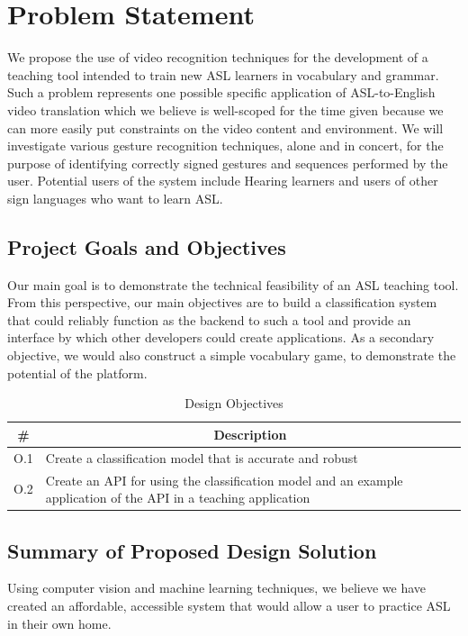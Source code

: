 \documentclass[12pt]{article}
\begin{document}
\newpage
\section{Problem Statement}
We propose the use of video recognition techniques for the development of a teaching tool intended to train new ASL learners in vocabulary and grammar. Such a problem represents one possible specific application of ASL-to-English video translation which we believe is well-scoped for the time given because we can more easily put constraints on the video content and environment. We will investigate various gesture recognition techniques, alone and in concert, for the purpose of identifying correctly signed gestures and sequences performed by the user. Potential users of the system include Hearing learners and users of other sign languages who want to learn ASL. 

\subsection{Project Goals and Objectives}
Our main goal is to demonstrate the technical feasibility of an ASL teaching tool. From this perspective, our main objectives are to build a classification system that could reliably function as the backend to such a tool and provide an interface by which other developers could create applications. As a secondary objective, we would also construct a simple vocabulary game, to demonstrate the potential of the platform.

\begin{table}[h]
\centering
\caption{Design Objectives}
\label{obj}
\begin{tabular}{|l|p{15cm}|}
\hline
\multicolumn{1}{|c|}{\textbf{\#}} & \multicolumn{1}{|c|}{\textbf{Description}} \\ \hline
O.1 & Create a classification model that is accurate and robust                                                        \\ \hline
O.2 & Create an API for using the classification model and an example application of the API in a teaching application \\ \hline
\end{tabular}
\end{table}

\subsection{Summary of Proposed Design Solution}
Using computer vision and machine learning techniques, we believe we have created an affordable, accessible system that would allow a user to practice ASL in their own home.
\end{document}
